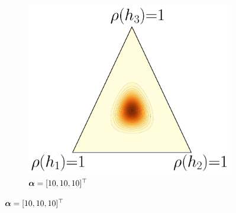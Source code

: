\begin{figure}
\hfill
\begin{subfigure}{0.32\textwidth}
    \includegraphics[width=\textwidth]{chapter_5/figures/dirichlet_10_10_10.pdf}
    \caption{$\boldsymbol{\alpha}=[10, 10, 10]^{\top}$}
\end{subfigure}


\end{figure}
